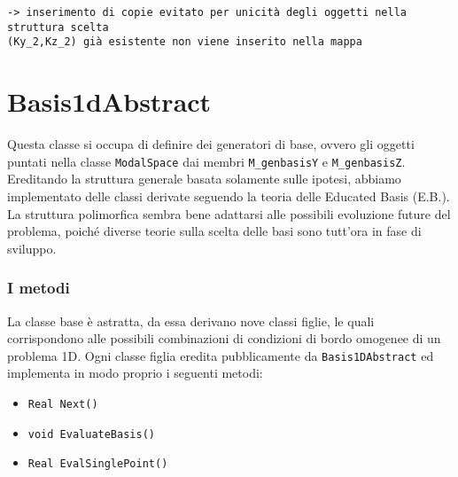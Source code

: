 \begin{lstlisting}[style = general,frame=top]
-> inserimento di copie evitato per unicità degli oggetti nella struttura scelta
(Ky_2,Kz_2) già esistente non viene inserito nella mappa
\end{lstlisting}



 \section{Basis1dAbstract}

Questa classe si occupa di definire dei generatori di base, ovvero gli oggetti puntati nella classe \texttt{ModalSpace} dai membri \texttt{M\_genbasisY} e \texttt{M\_genbasisZ}. Ereditando la struttura generale basata solamente sulle ipotesi, abbiamo implementato delle classi derivate seguendo la teoria delle Educated Basis (E.B.). La struttura polimorfica sembra bene adattarsi alle possibili evoluzione future del problema, poich\'e diverse teorie sulla scelta delle basi sono tutt'ora in fase di sviluppo.
 
\subsubsection{I metodi}

La classe base \`e astratta, da essa derivano nove classi figlie, le quali corrispondono alle possibili combinazioni di condizioni di bordo omogenee di un problema 1D. Ogni classe figlia eredita pubblicamente da \texttt{Basis1DAbstract} ed implementa in modo proprio i seguenti metodi:

\begin{itemize}
\item \texttt{Real Next()} 
\item \texttt{void EvaluateBasis()}
\item \texttt{Real EvalSinglePoint()}
\end{itemize}

